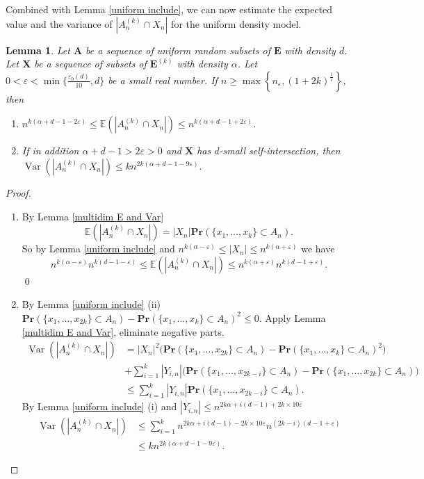 \documentclass{article}
\DeclareMathOperator{\Var}{Var}
\newcommand{\bs}{\boldsymbol}
\def\Pr{\mathbf{Pr}}
\newcommand\esp[1]{\mathbb{E}\left( #1 \right)}
\newtheorem{lem}[thm]{Lemma}
\theoremstyle{remark}
\begin{document}
Combined with Lemma \ref{uniform include}, we can now estimate the expected value and the variance of $|A_n^{(k)}\cap X_n|$ for the uniform density model.
\begin{lem}\label{multidim uniform E and Var} Let $\bs A$ be a sequence of uniform random subsets of $\bs E$ with density $d$. Let $\bs X$ be a sequence of subsets of $\bs E^{(k)}$ with density $\alpha$. Let $0<\varepsilon < \min\{\frac{\varepsilon_0(d)}{10},d\}$ be a small real number. If $n\geq \max\left\{n_\varepsilon,(1+2k)^{\frac{1}{\varepsilon}}\right\}$, then
\begin{enumerate}[$(i)$]
    \item $n^{k(\alpha+d-1-2\varepsilon)} \leq \esp{|A_n^{(k)}\cap X_n|} \leq n^{k(\alpha+d-1+2\varepsilon)}$.
    \item If in addition $\alpha+d-1>2\varepsilon>0$ and $\bs X$ has $d$-small self-intersection, then\\ $\Var\left(|A_n^{(k)}\cap X_n|\right)\leq kn^{2k(\alpha+d-1-9\varepsilon)}.$
\end{enumerate}
\end{lem}
\begin{proof}\quad
\begin{enumerate}[$(i)$]
    \item By Lemma \ref{multidim E and Var}
    \[\esp{|A_n^{(k)}\cap X_n|} = |X_n|\Pr\left(\{x_1,\dots,x_k\}\subset A_n\right).\]
    So by Lemma \ref{uniform include} and $n^{k(\alpha-\varepsilon)}\leq |X_n|\leq n^{k(\alpha+\varepsilon)}$ we have
    \[n^{k(\alpha-\varepsilon)}n^{k(d-1-\varepsilon)} \leq \esp{|A_n^{(k)}\cap X_n|} \leq n^{k(\alpha+\varepsilon)}n^{k(d-1+\varepsilon)}.\]\qed
    \item By Lemma \ref{uniform include} (ii) $\Pr(\{x_1,\dots,x_{2k}\}\subset A_n) - \Pr(\{x_1,\dots,x_{k}\}\subset A_n)^2 \leq 0$. Apply Lemma \ref{multidim E and Var}, eliminate negative parts.
    \begin{align*} \Var\left(|A_n^{(k)}\cap X_n|\right) & =  |X_n|^2\Big(\Pr(\{x_1,\dots,x_{2k}\}\subset A_n) - \Pr(\{x_1,\dots,x_{k}\}\subset A_n)^2\Big) \\
    & + \sum_{i=1}^{k}|Y_{i,n}|\Big(\Pr(\{x_1,\dots,x_{2k-i}\}\subset A_n) - \Pr(\{x_1,\dots,x_{2k}\}\subset A_n)\Big)\\
    & \leq \sum_{i=1}^{k}|Y_{i,n}|\Pr(\{x_1,\dots,x_{2k-i}\}\subset A_n).
    \end{align*}
    By Lemma \ref{uniform include} (i) and $|Y_{i,n}|\leq n^{2k\alpha+i(d-1)+2k\times10\varepsilon}$
    \begin{align*}
    \Var\left(|A_n^{(k)}\cap X_n|\right) & \leq \sum_{i=1}^{k}n^{2k\alpha+i(d-1)-2k\times10\varepsilon} n^{(2k-i)(d-1+\varepsilon)}\\
    & \leq kn^{2k(\alpha+d-1-9\varepsilon)}.
    \end{align*}
\end{enumerate}
\end{proof}
\end{document}
